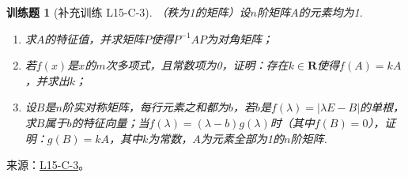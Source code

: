 \documentclass[UTF8,12pt,a4paper,fontset=fandol]{ctexart}
\newtheorem{exercise}{训练题}[section]
\begin{document}
\begin{exercise}[补充训练 L15-C-3]\label{prob:L15-C-3}
（秩为1的矩阵）设$n$阶矩阵$A$的元素均为1.
        \begin{enumerate}
            \item 求$A$的特征值，并求矩阵$P$使得$P^{-1}AP$为对角矩阵；

            \item 若$f(x)$是$x$的$m$次多项式，且常数项为0，证明：存在$k\in\mathbf{R}$使得$f(A)=kA$，并求出$k$；

            \item 设$B$是$n$阶实对称矩阵，每行元素之和都为$b$，若$b$是$f(\lambda)=|\lambda E-B|$的单根，求$B$属于$b$的特征向量；当$f(\lambda)=(\lambda-b)g(\lambda)$时（其中$f(B)=0$），证明：$g(B)=kA$，其中$k$为常数，$A$为元素全部为1的$n$阶矩阵.
        \end{enumerate}
\end{exercise}
\noindent 来源：\href{https://github.com/yhwu-is/Linear-Algebra-Left-Undone/blob/new/%E8%AE%B2%E4%B9%89/%E4%B8%93%E9%A2%98/15%20%E7%9B%B8%E4%BC%BC%E6%A0%87%E5%87%86%E5%BD%A2%EF%BC%9A%E5%A4%8D%E6%95%B0%E5%9F%9F%E4%B8%8A%E7%9A%84%E5%B0%9D%E8%AF%95%E4%B8%8E%E7%90%86%E8%AE%BA.tex}{L15-C-3}。
\end{document}
